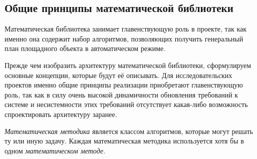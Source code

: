 \subsection{\large{Общие принципы математической библиотеки}}

Математическая библиотека занимает главенствующую роль в проекте, так как именно она содержит
набор алгоритмов, позволяющих получить генеральный план площадного объекта в автоматическом режиме.

Прежде чем изобразить архитектуру математической библиотеки, сформулируем основные концепции,
которые будут её описывать.
Для исследовательских проектов именно общие принципы реализации
приобретают главенствующую роль, так как в силу очень высокой динамичности обновления требований к системе
и несистемности этих требований отсутствует какая-либо возможность спроектировать архитектуру заранее.

\textit{Математическая методика} является классом алгоритмов, которые могут решать ту или иную задачу.
Каждая математическая методика используется хотя бы в одном \textit{математическом методе}.

